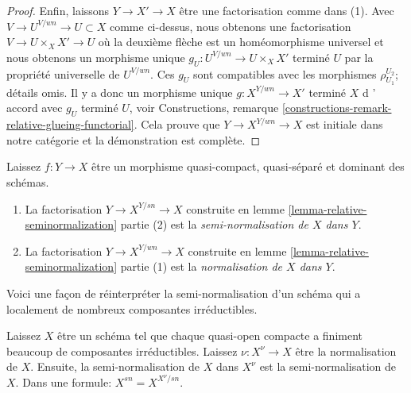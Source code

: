 \begin{proof}
\medskip\noindent

Enfin, laissons $Y \to X' \to X$ être une factorisation comme dans (1). Avec $V \to U^{V/wn} \to U \subset X$ comme ci-dessus, nous obtenons une factorisation $V \to U \times_X X' \to U$ où la deuxième flèche est un homéomorphisme universel et nous obtenons un morphisme unique $g_U : U^{V/wn} \to U \times_X X'$ terminé $U$
par la propriété universelle de $U^{V/wn}$. Ces $g_U$ sont compatibles avec les morphismes $\rho_{U_1}^{U_2}$; détails omis. Il y a donc un morphisme unique $g : X^{Y/wn} \to X'$
terminé $X$ d ' accord avec $g_U$ terminé $U$, voir Constructions, remarque \ref{constructions-remark-relative-glueing-functorial}. Cela prouve que $Y \to X^{Y/wn} \to X$ est initiale dans notre catégorie et la démonstration est complète.

\end{proof}

\begin{definition}

\label{definition-relative-seminormalization}
Laissez $f : Y \to X$ être un morphisme quasi-compact, quasi-séparé et dominant des schémas.
\begin{enumerate}
\item La factorisation $Y \to X^{Y/sn} \to X$ construite en lemme \ref{lemma-relative-seminormalization} partie (2) est la {\it semi-normalisation de $X$ dans $Y$}.
\item La factorisation $Y \to X^{Y/wn} \to X$ construite en lemme \ref{lemma-relative-seminormalization} partie (1) est la {\it normalisation de $X$ dans $Y$}.
\end{enumerate}

\end{definition}

\noindent
Voici une façon de réinterpréter la semi-normalisation d'un schéma qui a localement de nombreux composantes irréductibles.

\begin{lemma}

\label{lemma-seminormal-and-normalization}
Laissez $X$ être un schéma tel que chaque quasi-open compacte a finiment beaucoup de composantes irréductibles. Laissez $\nu : X^\nu \to X$ être la normalisation de $X$. Ensuite, la semi-normalisation de $X$ dans $X^\nu$ est la semi-normalisation de $X$. Dans une formule: $X^{sn} = X^{X^\nu/sn}$.
\end{lemma}

